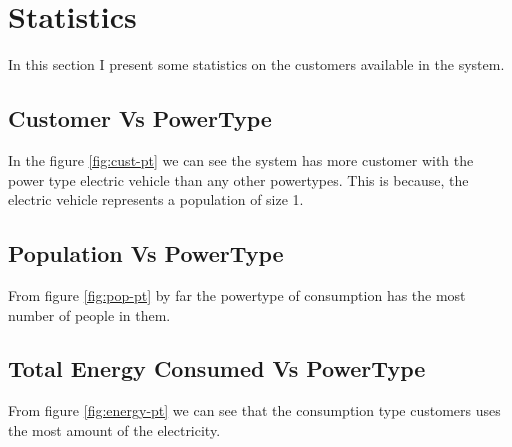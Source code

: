 \section{Statistics}
In this section I present some statistics on the customers available in the system. 

\subsection {Customer Vs PowerType}

In the figure \ref{fig:cust-pt} we can see the system has more customer with the power type electric vehicle than any other powertypes. This is because, the electric vehicle represents a population of size 1.

\subsection {Population Vs PowerType}
From figure \ref{fig:pop-pt} by far the powertype of consumption has the most number of people in them.

\subsection {Total Energy Consumed Vs PowerType}
From figure \ref{fig:energy-pt} we can see that the consumption type customers uses the most amount of the electricity.


